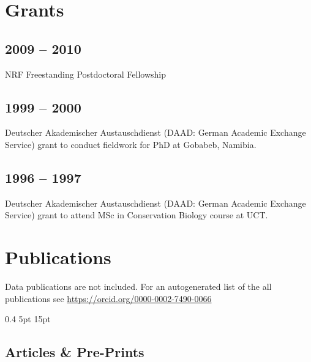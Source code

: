 \documentclass[a4paper]{article}
\begin{document}



\section{Grants}

\subsection{2009 -- 2010}

NRF Freestanding Postdoctoral Fellowship

\subsection{1999 -- 2000}

Deutscher Akademischer Austauschdienst (DAAD: German Academic Exchange
	Service) grant to conduct fieldwork for PhD at Gobabeb, Namibia.

\subsection{1996 -- 1997}

Deutscher Akademischer Austauschdienst (DAAD: German Academic Exchange
	Service) grant to attend MSc in Conservation Biology course at UCT.

\section{Publications}

Data publications are not included. For an autogenerated list of the all
	publications see \url{https://orcid.org/0000-0002-7490-0066}

\titlespacing{\subsection}
            {0.4\textwidth}%
            {5pt}%
            {15pt}%
            
            
\subsection{Articles \& Pre-Prints}
\end{document}
